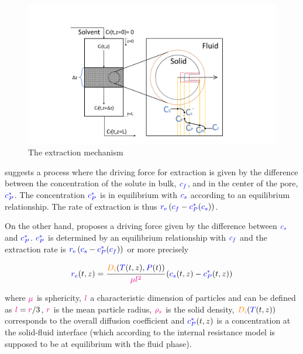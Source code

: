 \documentclass[../Article_Model_Parameters.tex]{subfiles}
\begin{document}
		\begin{figure}[h!]
			\centering
			\includegraphics[trim = 5.8cm 1.1cm 6cm 3cm,clip,width=\columnwidth]{Figures/SFE_draft.pdf}	
			\caption{The extraction mechanism}
			\label{fig: SFE_Mechanism}
		\end{figure}
			
		\citet{Bulley1984} suggests a process where the driving force for extraction is given by the difference between the concentration of the solute in bulk, ${\color{blue}c_f}$, and in the center of the pore, ${\color{blue}c_P^*}$. The concentration ${\color{blue}c_P^*}$ is in equilibrium with ${\color{blue}c_s}$ according to an equilibrium relationship. The rate of extraction is thus ${\color{blue}r_\text{e}}\left({\color{blue}c_f} - {\color{blue}c^*_P}({\color{blue}c_s})\right)$.  
			
		On the other hand, \citet{Reverchon1996} proposes a driving force given by the difference between ${\color{blue}c_s}$ and ${\color{blue}c_P^*}$. ${\color{blue}c_P^*}$ is determined by an equilibrium relationship with ${\color{blue}c_f}$ and the extraction rate is ${\color{blue}r_\text{e}}\left({\color{blue}c_s} - {\color{blue}c^*_P}({\color{blue}c_f})\right)$ or more precisely
			
			{\footnotesize
				\begin{equation} \label{Model_kinetic_basic}
					{\color{blue}r_e}(t,z) = \cfrac{{\color{orange}D_i}({\color{blue}T}(t,z), {\color{blue}P}(t))}{{\color{magenta} \mu l^2} }\left({\color{blue}c_s}(t,z) - {\color{blue}c_P^*}(t,z) \right)
			\end{equation} }
			
		where ${\color{magenta}\mu}$ is sphericity, ${\color{magenta}l}$ a characteristic dimension of particles and can be defined as ${\color{magenta}l} = {\color{magenta}r}/3$, ${\color{magenta}r}$ is the mean particle radius, ${\color{magenta}\rho_s}$ is the solid density, ${\color{orange}D_i}({\color{blue}T}(t,z))$ corresponds to the overall diffusion coefficient and ${\color{blue}c_P^*}(t,z)$ is a concentration at the solid-fluid interface (which according to the internal resistance model is supposed to be at equilibrium with the fluid phase). 
			
\end{document}
